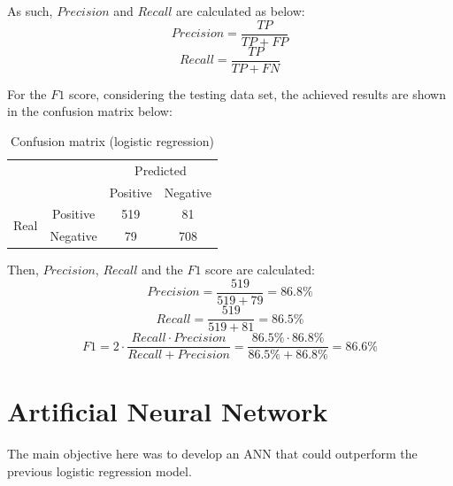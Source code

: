 \documentclass[conference]{IEEEtran}
\begin{document}
As such, $Precision$ and $Recall$ are calculated as below:
\begin{equation}
    Precision = \frac{TP}{TP+FP}
    \label{eq7}
\end{equation}
\begin{equation}
    Recall = \frac{TP}{TP+FN}
    \label{eq8}
\end{equation}

For the $F1$ score, considering the testing data set, the achieved results are shown in the confusion matrix below:
\begin{table}[H]
\centering
\caption{Confusion matrix (logistic regression)}
\label{tab:my-table}
\begin{tabular}{cccc}
                                       &                       & \multicolumn{2}{c}{Predicted}                          \\ \cline{3-4} 
                                       & \multicolumn{1}{c|}{} & \multicolumn{1}{c|}{Positive} & \multicolumn{1}{c|}{Negative} \\ \cline{2-4} 
\multicolumn{1}{c|}{\multirow{2}{*}{Real}} & \multicolumn{1}{c|}{Positive} & \multicolumn{1}{c|}{519} & \multicolumn{1}{c|}{81} \\ \cline{2-4} 
\multicolumn{1}{c|}{}                  & \multicolumn{1}{c|}{Negative} & \multicolumn{1}{c|}{79} & \multicolumn{1}{c|}{708} \\ \cline{2-4} 
\end{tabular}
\end{table}
\par Then, $Precision$, $Recall$ and the $F1$ score are calculated:
\begin{equation}
    Precision = \frac{519}{519+79} = 86.8\%
    \label{eq9}
\end{equation}
\begin{equation}
    Recall = \frac{519}{519+81} = 86.5\%
    \label{eq10}
\end{equation}
\begin{equation}
    F1 = 2 \cdot \frac{Recall \cdot Precision}{Recall+Precision} = \frac{86.5\% \cdot 86.8\%}{86.5\%+86.8\%} = 86.6\%
    \label{eq11}
\end{equation}



\section{Artificial Neural Network}
The main objective here was to develop an ANN that could outperform the previous logistic regression model. 
\end{document}
